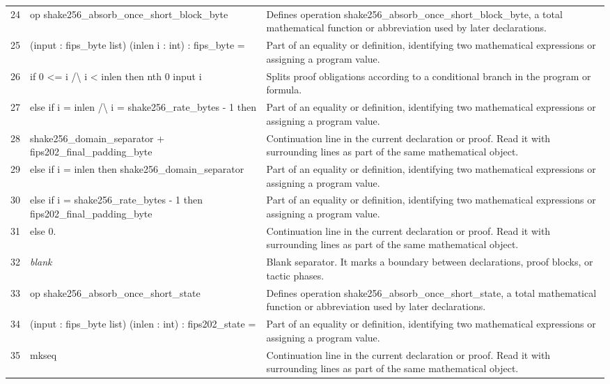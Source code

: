 \documentclass[10pt]{article}
\begin{document}
\begin{longtable}{r L{0.53\textwidth} L{0.37\textwidth}}
24 & {\ttfamily\scriptsize op shake256\_absorb\_once\_short\_block\_byte} & Defines operation shake256\_absorb\_once\_short\_block\_byte, a total mathematical function or abbreviation used by later declarations. \\
25 & {\ttfamily\scriptsize    (input : fips\_byte list) (inlen i : int) : fips\_byte =} & Part of an equality or definition, identifying two mathematical expressions or assigning a program value. \\
26 & {\ttfamily\scriptsize   if 0 <= i /\textbackslash{} i < inlen then nth 0 input i} & Splits proof obligations according to a conditional branch in the program or formula. \\
27 & {\ttfamily\scriptsize   else if i = inlen /\textbackslash{} i = shake256\_rate\_bytes - 1 then} & Part of an equality or definition, identifying two mathematical expressions or assigning a program value. \\
28 & {\ttfamily\scriptsize     shake256\_domain\_separator + fips202\_final\_padding\_byte} & Continuation line in the current declaration or proof.  Read it with surrounding lines as part of the same mathematical object. \\
29 & {\ttfamily\scriptsize   else if i = inlen then shake256\_domain\_separator} & Part of an equality or definition, identifying two mathematical expressions or assigning a program value. \\
30 & {\ttfamily\scriptsize   else if i = shake256\_rate\_bytes - 1 then fips202\_final\_padding\_byte} & Part of an equality or definition, identifying two mathematical expressions or assigning a program value. \\
31 & {\ttfamily\scriptsize   else 0.} & Continuation line in the current declaration or proof.  Read it with surrounding lines as part of the same mathematical object. \\
32 & {\ttfamily\scriptsize \emph{blank}} & Blank separator.  It marks a boundary between declarations, proof blocks, or tactic phases. \\
33 & {\ttfamily\scriptsize op shake256\_absorb\_once\_short\_state} & Defines operation shake256\_absorb\_once\_short\_state, a total mathematical function or abbreviation used by later declarations. \\
34 & {\ttfamily\scriptsize    (input : fips\_byte list) (inlen : int) : fips202\_state =} & Part of an equality or definition, identifying two mathematical expressions or assigning a program value. \\
35 & {\ttfamily\scriptsize   mkseq} & Continuation line in the current declaration or proof.  Read it with surrounding lines as part of the same mathematical object. \\

\end{longtable}
\end{document}

